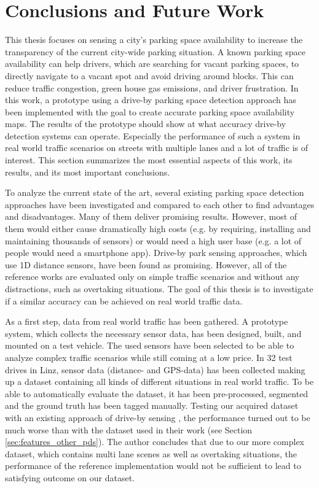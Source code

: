 \chapter{Conclusions and Future Work}
\label{chap:conclusion}



This thesis focuses on sensing a city's parking space availability to increase the transparency of the current city-wide parking situation. 
A known parking space availability can help drivers, which are searching for vacant parking spaces, to directly navigate to a vacant spot and avoid driving around blocks. This can reduce traffic congestion, green house gas emissions, and driver frustration. 
In this work, a prototype using a drive-by parking space detection approach has been implemented with the goal to create accurate parking space availability maps. The results of the prototype should show at what accuracy drive-by detection systems can operate. Especially the performance of such a system in real world traffic scenarios on streets with multiple lanes and a lot of traffic is of interest.
This section summarizes the most essential aspects of this work, its results, and its most important conclusions.



To analyze the current state of the art, several existing parking space detection approaches have been investigated and compared to each other to find advantages and disadvantages.
Many of them deliver promising results. However, most of them would either cause dramatically high costs (e.g. by requiring, installing and maintaining thousands of sensors) or would need a high user base (e.g. a lot of people would need a smartphone app). 
 Drive-by park sensing approaches, which use 1D distance sensors, have been found as promising. However, all of the reference works are evaluated only on simple traffic scenarios and without any distractions, such as overtaking situations. 
The goal of this thesis is to investigate if a similar accuracy can be achieved on real world traffic data.

As a first step, data from real world traffic has been gathered. A prototype system, which collects the necessary sensor data, has been designed, built, and mounted on a test vehicle. The used sensors have been selected to be able to analyze complex traffic scenarios while still coming at a low price. 
In 32 test drives in Linz, sensor data (distance- and GPS-data) has been collected making up a dataset containing all kinds of different situations in real world traffic. To be able to automatically evaluate the dataset, it has been pre-processed, segmented and the ground truth has been tagged manually. 
Testing our acquired dataset with an existing approach of drive-by sensing \cite{Mathur:2010:PDS:1814433.1814448}, the performance turned out to be much worse than with the dataset used in their work (see Section \ref{sec:features_other_pds}). The author concludes that due to our more complex dataset, which contains multi lane scenes as well as overtaking situations, the performance of the reference implementation would not be sufficient to lead to satisfying outcome on our dataset.

